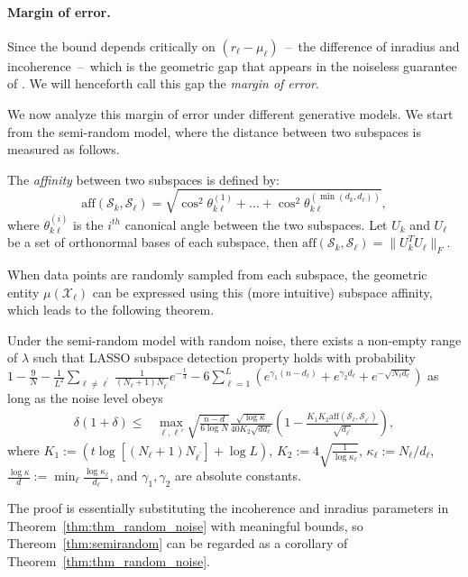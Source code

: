 \documentclass[12pt,heading]{ctexbook}
\begin{document}


\paragraph{Margin of error.}
Since the bound depends critically on $(r_\ell-\mu_\ell)$~--~the difference of inradius and incoherence~--~which is the geometric gap that appears in the noiseless guarantee of \cite{soltanolkotabi2011geometric}. We will henceforth call this gap the \emph{margin of error}.

We now analyze this margin of error under different generative models. We
start from the semi-random model, where the distance between two subspaces is measured as follows.
\begin{definition}\label{def:subspace_affinity}
The {\em affinity} between two subspaces is defined by:
$$ \mathrm{aff}(\mathcal{S}_k,\mathcal{S}_{\ell}) = \sqrt{\cos^2{\theta^{(1)}_{k\ell }}+...+\cos^2{\theta^{(\min(d_k,d_{\ell}))}_{k\ell}}},$$
where $\theta_{k\ell}^{(i)}$ is the $i^{th}$ canonical angle between the two subspaces. Let $U_{k}$ and $U_{\ell}$ be a set of orthonormal bases of each subspace, then $\mathrm{aff}(\mathcal{S}_k,\mathcal{S}_{\ell})=\|U_{k}^TU_{\ell}\|_F$.
\end{definition}
When data points are randomly sampled from each subspace, the geometric entity $\mu(\mathcal{X}_{\ell})$ can be expressed using this (more intuitive) subspace affinity, which leads to the following theorem.


\begin{theorem}\label{thm:semirandom}
Under the semi-random model with random noise, there exists a non-empty range of $\lambda$ such that LASSO subspace detection property holds with probability $1- \frac{9}{N} - \frac{1}{L^2}\sum_{\ell\neq \ell^\prime}\frac{1}{(N_{\ell}+1)N_{\ell^\prime}} e^{-\frac{t}{4}} -6\sum_{\ell=1}^L (e^{\gamma_1 (n-d_\ell)}+e^{\gamma_2 d_\ell}+e^{-\sqrt{N_{\ell}d_{\ell}}})$ as long as the noise level obeys
\begin{align*}
 \delta(1+\delta) \leq& \max_{\ell,\ell'}\sqrt{\frac{n-d}{6\log N}} \frac{\sqrt{\log \kappa}}{40K_2\sqrt{dd_\ell}}\left(1- \frac{K_1K_2 \mathrm{aff}(\mathcal{S}_{\ell},\mathcal{S}_{\ell^\prime})}{\sqrt{ d_{\ell^\prime}}} \right),
\end{align*}
where $K_1:= (t \log  [(N_{\ell}+1)N_{\ell^\prime}] + \log L)$, $K_2 := 4\sqrt{\frac{1}{\log\kappa_\ell}}$, $\kappa_\ell := N_{\ell}/d_{\ell}$, $\frac{\log\kappa}{d} :=\min_{\ell} \frac{\log\kappa_\ell}{d_\ell}$, and
$\gamma_1,\gamma_2$ are absolute constants.
\end{theorem}
The proof is essentially substituting the incoherence and inradius parameters in Theorem~\ref{thm:thm_random_noise} with meaningful bounds, so Thereom~\ref{thm:semirandom} can be regarded as a corollary of Theorem~\ref{thm:thm_random_noise}.
\end{document}
